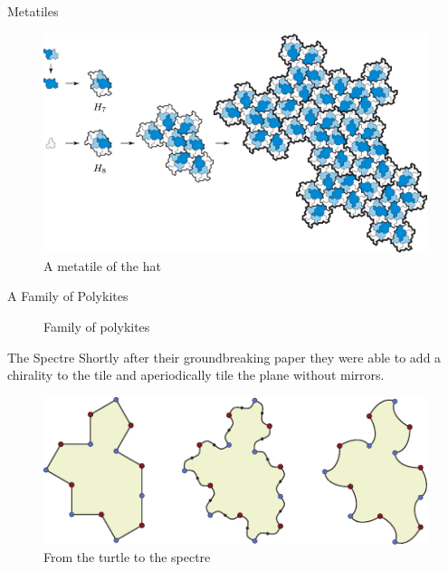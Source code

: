 \documentclass{beamer}
\begin{document}
    

\begin{frame}{Metatiles}
    \begin{figure}
        \centering
        \includegraphics[page=1,width=\textwidth]{images/aperiodic-pdfs/alt_subst.pdf}
        \caption{A metatile of the hat}
        \label{fig:hat-metatile}
    \end{figure}
\end{frame}

\begin{frame}{A Family of Polykites}
    \begin{figure}
        \centering
        
        \caption{Family of polykites}
        \label{fig:other-polykites}
    \end{figure}
\end{frame}

\begin{frame}{The Spectre}
    Shortly after their groundbreaking paper they were able to add a chirality to the tile and aperiodically tile the plane without mirrors. \cite{Smith_2024_chiral}
    \begin{figure}
        \centering
        \includegraphics[width=\linewidth]{images/aperiodic-pdfs/polygon_to_spectre.pdf}
        \caption{From the turtle to the spectre}
        \label{fig:turle-spectra}
    \end{figure}
\end{frame}
\end{document}
